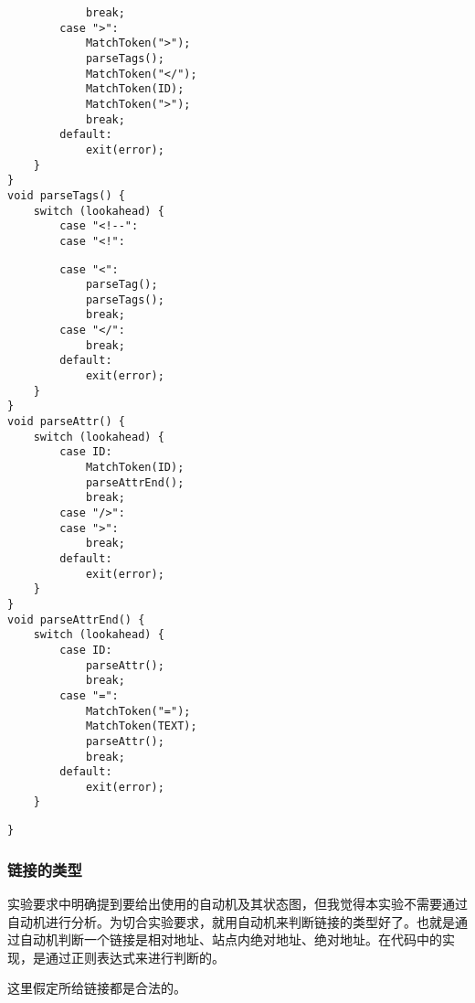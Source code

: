 \documentclass[a4paper]{article}
\begin{document}
\begin{CJK*}{UTF8}{gbsn}
\begin{lstlisting}
            break;
        case ">":
            MatchToken(">");
            parseTags();
            MatchToken("</");
            MatchToken(ID);
            MatchToken(">");
            break;
        default:
            exit(error);
    }
}
void parseTags() {
    switch (lookahead) {
        case "<!--":
        case "<!":
\end{lstlisting}\clearpage
\begin{lstlisting}
        case "<":
            parseTag();
            parseTags();
            break;
        case "</":
            break;
        default:
            exit(error);
    }
}
void parseAttr() {
    switch (lookahead) {
        case ID:
            MatchToken(ID);
            parseAttrEnd();
            break;
        case "/>":
        case ">":
            break;
        default:
            exit(error);
    }
}
void parseAttrEnd() {
    switch (lookahead) {
        case ID:
            parseAttr();
            break;
        case "=":
            MatchToken("=");
            MatchToken(TEXT);
            parseAttr();
            break;
        default:
            exit(error);
    }
\end{lstlisting}\clearpage
\begin{lstlisting}
}
    \end{lstlisting}

    \subsubsection{链接的类型}
    实验要求中明确提到要给出使用的自动机及其状态图，但我觉得本实验不需要通过自动机进行分析。为切合实验要求，就用自动机来判断链接的类型好了。也就是通过自动机判断一个链接是相对地址、站点内绝对地址、绝对地址。在代码中的实现，是通过正则表达式来进行判断的。
    \par 这里假定所给链接都是合法的。
    \par 


\end{CJK*}
\end{document}
